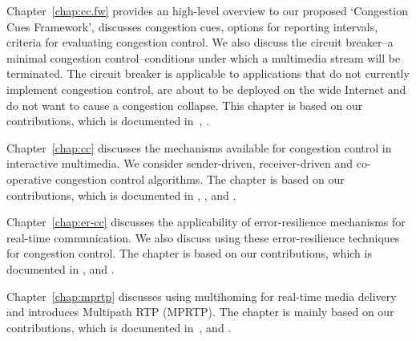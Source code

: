 
Chapter~\ref{chap:cc.fw} provides an high-level overview to our proposed
`Congestion Cues Framework', discusses congestion cues, options for reporting
intervals, criteria for evaluating congestion control. We also discuss the
circuit breaker--a minimal congestion control--conditions under which a
multimedia stream will be terminated. The circuit breaker is applicable to
applications that do not currently implement congestion control, are about to
be deployed on the wide Internet and do not want to cause a congestion
collapse. This chapter is based on our contributions, which is documented
in~\cite{Singh:control.loops.api, draft.rmcat.app.interaction,
draft.rmcat.evaluate, Singh:PhDFw, draft.rtp.cb}, .



Chapter~\ref{chap:cc} discusses the mechanisms available for congestion
control in interactive multimedia. We consider sender-driven, receiver-driven
and co-operative congestion control algorithms. The chapter is based on our
contributions, which is documented in , ,
\cite{singh:2010.thesis} and .


Chapter~\ref{chap:er-cc} discusses the applicability of error-resilience
mechanisms for real-time communication. We also discuss using these
error-resilience techniques for congestion control. The chapter is based on
our contributions, which is documented in , and
.


Chapter~\ref{chap:mprtp} discusses using multihoming for real-time media
delivery and introduces Multipath RTP (MPRTP). The chapter is mainly based on
our contributions, which is documented in~\cite{draft.mprtp, draft.mprtp.sdp,
Globisch:AsymGrpComm, draft.rtcp.overlay}, and .


